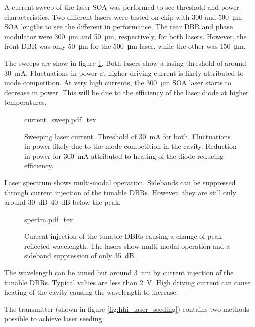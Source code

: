 A current sweep of the laser \ac{SOA} was performed to see threshold and power characteristics. Two different lasers were tested on chip with \num{300} and \SI{500}{\um} \ac{SOA} lengths to see the different in performance. The rear \ac{DBR} and phase modulator were \SI{300}{\um} and \SI{50}{\um}, respectively, for both lasers. However, the front \ac{DBR} was only \SI{50}{\um} for the \SI{500}{\um} laser, while the other was \SI{150}{\um}.

The sweeps are show in figure \ref{fig:hhi_soa_sweep}. Both lasers show a lasing threshold of around \SI{30}{\mA}. Fluctuations in power at higher driving current is likely attributed to mode competition. At very high currents, the \SI{300}{\um} \ac{SOA} laser starts to decrease in power. This will be due to the efficiency of the laser diode at higher temperatures.

\begin{figure}[tp]
	\centering
	\small	
	\def\svgwidth{0.9\textwidth} 
	{current_sweep.pdf_tex}
	\caption[Current sweep of HHI laser SOA]{Sweeping laser current. Threshold of \SI{30}{\mA} for both. Fluctuations in power likely due to the mode competition in the cavity. Reduction in power for \SI{300}{mA} attributed to heating of the diode reducing efficiency.}
	\label{fig:hhi_soa_sweep}
\end{figure}

Laser spectrum shows multi-modal operation. Sidebands can be suppressed through current injection of the tunable \acp{DBR}. However, they are still only around \SIrange{30}{40}{dB} below the peak. 

\begin{figure}[tp]
	\centering
	\small	
	\def\svgwidth{0.9\textwidth} 
	{spectra.pdf_tex}
	\caption[Wavelength sweep through current injection of tunable DBRs]{Current injection of the tunable \acp{DBR} causing a change of peak reflected wavelength. The lasers show multi-modal operation and a sideband suppression of only \SI{35}{dB}.}
	\label{fig:hhi_dbr_sweep}
\end{figure}

The wavelength can be tuned but around \SI{3}{nm} by current injection of the tunable \acp{DBR}. Typical values are less than \SI{2}{V}. High driving current can cause heating of the cavity causing the wavelength to increase. 

The transmitter (shown in figure \ref{fig:hhi_laser_seeding}) contains two methods possible to achieve laser seeding.

